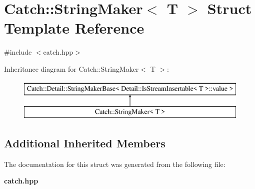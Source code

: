 \section{Catch\+:\+:String\+Maker$<$ T $>$ Struct Template Reference}
\label{struct_catch_1_1_string_maker}


{\ttfamily \#include $<$catch.\+hpp$>$}

Inheritance diagram for Catch\+:\+:String\+Maker$<$ T $>$\+:\begin{figure}[H]
\begin{center}
\leavevmode
\includegraphics[height=2.000000cm]{struct_catch_1_1_string_maker}
\end{center}
\end{figure}
\subsection*{Additional Inherited Members}


The documentation for this struct was generated from the following file\+:\begin{DoxyCompactItemize}
\item 
\textbf{ catch.\+hpp}\end{DoxyCompactItemize}
